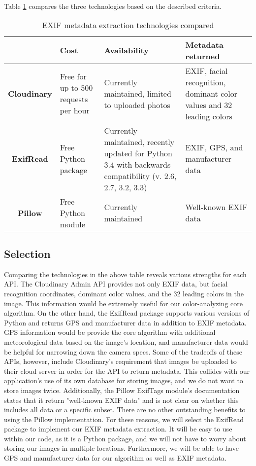 \documentclass[onecolumn, draftclsnofoot,10pt, compsoc]{IEEEtran}
\begin{document}
\begin{flushleft}
\medskip

Table \ref{table:2} compares the three technologies based on the described criteria. \cite{22} \cite{23} \cite{24}
\begin{table}[h!]
\caption{EXIF metadata extraction technologies compared}\label{table:2}
\centering
	\begin{tabular}{| c | p{3cm} |  p{6cm}  |  p{6cm}  |} 
		\hline
		 & Cost & Availability & Metadata returned\\ [0.5ex] 
		\hline
		\textbf{Cloudinary} & Free for up to 500 requests per hour & Currently maintained, limited to uploaded photos & EXIF, facial recognition, dominant color values and 32 leading colors \\ 
		\hline
		\textbf{ExifRead} & Free Python package & Currently maintained, recently updated for Python 3.4 with backwards compatibility (v. 2.6, 2.7, 3.2, 3.3) & EXIF, GPS, and manufacturer data \\
		\hline
		\textbf{Pillow} & Free Python module & Currently maintained & Well-known EXIF data \\
		\hline
	\end{tabular}
\end{table}
\subsection{Selection}
Comparing the technologies in the above table reveals various strengths for each API. The Cloudinary Admin API provides not only EXIF data, but facial recognition coordinates, dominant color values, and the 32 leading colors in the image. \cite{22} This information would be extremely useful for our color-analyzing core algorithm. On the other hand, the ExifRead package supports various versions of Python and returns GPS and manufacturer data in addition to EXIF metadata. \cite{23} GPS information would be provide the core algorithm with additional meteorological data based on the image's location, and manufacturer data would be helpful for narrowing down the camera specs. Some of the tradeoffs of these APIs, however, include Cloudinary's requirement that images be uploaded to their cloud server in order for the API to return metadata. This collides with our application's use of its own database for storing images, and we do not want to store images twice. Additionally, the Pillow ExifTags module's documentation states that it return "well-known EXIF data" and is not clear on whether this includes all data or a specific subset. \cite{24} There are no other outstanding benefits to using the Pillow implementation. For these reasons, we will select the ExifRead package to implement our EXIF metadata extraction. It will be easy to use within our code, as it is a Python package, and we will not have to worry about storing our images in multiple locations. Furthermore, we will be able to have GPS and manufacturer data for our algorithm as well as EXIF metadata.





\end{flushleft}
\end{document}
